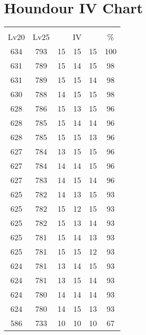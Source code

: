 \documentclass{article}%
\begin{document}
%
\normalsize%
\section{Houndour IV Chart}%
\label{sec:Houndour IV Chart}%
\renewcommand{\arraystretch}{1.5}%
\begin{tabular}{|c|c|c|c|c|c|}%
\hline%
\multicolumn{6}{|c|}{\textcolor{white}{ 
\linebreak{Houndour}
}%
\cellcolor{black}}\\%
\multicolumn{1}{|c}{Lv20}&\multicolumn{1}{c|}{Lv25}&\multicolumn{3}{c|}{IV}&\multicolumn{1}{|c|}{\%}\\%
\hline%
\rowcolor{color100}%
634&793&15&15&15&100\\%
\hline%
\rowcolor{color98}%
631&789&15&14&15&98\\%
\hline%
\rowcolor{color98}%
631&789&15&15&14&98\\%
\hline%
\rowcolor{color98}%
630&788&14&15&15&98\\%
\hline%
\rowcolor{color96}%
628&786&15&13&15&96\\%
\hline%
\rowcolor{color96}%
628&785&15&14&14&96\\%
\hline%
\rowcolor{color96}%
628&785&15&15&13&96\\%
\hline%
\rowcolor{color96}%
627&784&13&15&15&96\\%
\hline%
\rowcolor{color96}%
627&784&14&14&15&96\\%
\hline%
\rowcolor{color96}%
627&783&14&15&14&96\\%
\hline%
\rowcolor{color93}%
625&782&14&13&15&93\\%
\hline%
\rowcolor{color93}%
625&782&15&12&15&93\\%
\hline%
\rowcolor{color93}%
625&782&15&13&14&93\\%
\hline%
\rowcolor{color93}%
625&781&15&14&13&93\\%
\hline%
\rowcolor{color93}%
625&781&15&15&12&93\\%
\hline%
\rowcolor{color93}%
624&781&13&14&15&93\\%
\hline%
\rowcolor{color93}%
624&781&13&15&14&93\\%
\hline%
\rowcolor{color93}%
624&780&14&14&14&93\\%
\hline%
\rowcolor{color93}%
624&780&14&15&13&93\\%
\hline%
\rowcolor{color91}%
586&733&10&10&10&67\\%
\end{tabular}

%
\end{document}
